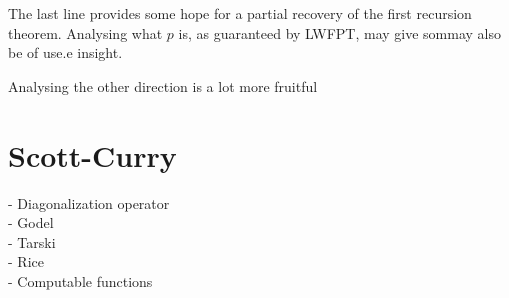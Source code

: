 \documentclass[a4paper,10pt]{article}
\begin{document}
The last line provides some hope for a partial recovery of the first recursion
theorem. Analysing what $p$ is, as guaranteed by LWFPT, may give sommay also be of use.e insight.


Analysing the other direction is a lot more fruitful

\section{Scott-Curry}
  - Diagonalization operator \\
  - Godel \\
  - Tarski \\
  - Rice \\
  - Computable functions \\
\end{document}
